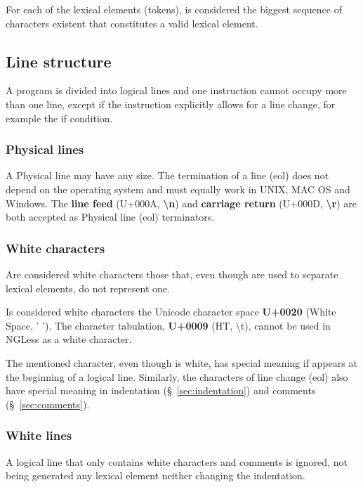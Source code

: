 \documentclass{article}
\begin{document}
For each of the lexical elements (tokens), is considered the biggest sequence of characters existent that constitutes a valid lexical element.

\subsection{Line structure}

A program is divided into logical lines and one instruction cannot occupy more than one line, except if the instruction explicitly allows for a line change, for example the if condition.

\subsubsection{Physical lines}

A Physical line may have any size. The termination of a line (eol) does not depend on the operating system and must equally work in UNIX, MAC OS and Windows. The \textbf{line feed} (U+000A, \textbf{\textbackslash n}) and \textbf{carriage return} (U+000D, \textbf{\textbackslash r}) are both accepted as Physical line (eol) terminators.

\subsubsection{White characters}
\label{sec:white}

Are considered white characters those that, even though are used to separate lexical elements, do not represent one. 

Is considered white characters the Unicode character space \textbf{U+0020} (White Space, ' '). The character tabulation, \textbf{U+0009} (HT, \textbackslash t), cannot be used in NGLess as a white character.

The mentioned character, even though is white, has special meaning if appears at the beginning of a logical line. Similarly, the characters of line change (eol) also have special meaning in indentation (§~\ref{sec:indentation}) and comments (§~\ref{sec:comments}).

\subsubsection{White lines}

A logical line that only contains white characters and comments is ignored, not being generated any lexical element neither changing the indentation.
\end{document}
